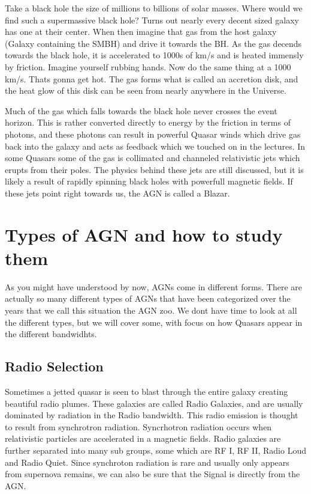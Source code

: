 \documentclass{article}
\begin{document}
Take a black hole the size of millions to billions of solar masses. Where would we find such a supermassive black hole? Turns out nearly every decent sized galaxy has one at their center. When then imagine that gas from the host galaxy (Galaxy containing the SMBH) and drive it towards the BH. As the gas decends towards the black hole, it is accelerated to 1000s of km/s and is heated immensly by friction. Imagine yourself rubbing hands. Now do the same thing at a 1000 km/s. Thats gonna get hot. The gas forms what is called an accretion disk, and the heat glow of this disk can be seen from nearly anywhere in the Universe.

Much of the gas which falls towards the black hole never crosses the event horizon. This is rather converted directly to energy by the friction in terms of photons, and these photons can result in powerful Quasar winds which drive gas back into the galaxy and acts as feedback which we touched on in the lectures. In some Quasars some of the gas is collimated and channeled relativistic jets which erupts from their poles. The physics behind these jets are still discussed, but it is likely a result of rapidly spinning black holes with powerfull magnetic fields. If these jets point right towards us, the AGN is called a Blazar.

\section*{Types of AGN and how to study them}
As you might have understood by now, AGNs come in different forms. There are actually so many different types of AGNs that have been categorized over the years that we call this situation the AGN zoo. We dont have time to look at all the different types, but we will cover some, with focus on how Quasars appear in the different bandwidhts.

\subsection*{Radio Selection}
Sometimes a jetted quasar is seen to blast through the entire galaxy creating beautiful radio plumes. These galaxies are called Radio Galaxies, and are usually dominated by radiation in the Radio bandwidth. This radio emission is thought to result from synchrotron radiation. Syncrhotron radiation occurs when relativistic particles are accelerated in a magnetic fields. Radio galaxies are further separated into many sub groups, some which are RF I, RF II, Radio Loud and Radio Quiet. Since synchroton radiation is rare and usually only appears from supernova remains, we can also be sure that the Signal is directly from the AGN.
\end{document}
